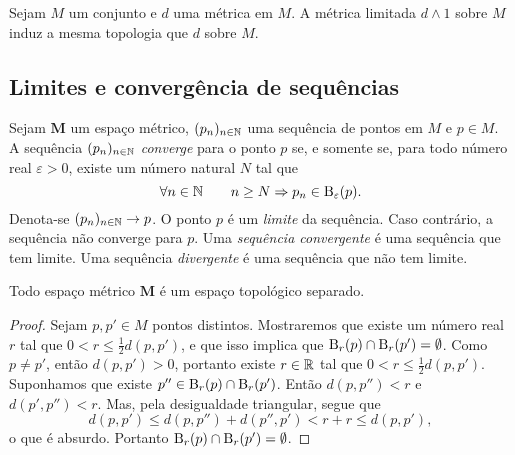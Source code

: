 \begin{exercise}
Sejam $M$ um conjunto e $d$ uma métrica em $M$. A métrica limitada $d \wedge 1$ sobre $M$ induz a mesma topologia que $d$ sobre $M$.
\end{exercise}

\subsection{Limites e convergência de sequências}

\begin{definition}
Sejam $\bm M$ um espaço métrico, $(p_n)_{n \in \mathbb{N}}$ uma sequência de pontos em $M$ e $p \in M$. A sequência $(p_n)_{n \in \mathbb{N}}$  \emph{converge} para o ponto $p$ se, e somente se, para todo número real $\varepsilon > 0$, existe um número natural $N$ tal que
	\begin{equation*}
	\forall n \in \mathbb{N} \qquad n \geq N \Rightarrow p_n \in \mathrm{B}_\varepsilon(p).
	\end{equation*}
Denota-se $(p_n)_{n \in \mathbb{N}} \rightarrow p$. O ponto $p$ é um \emph{limite} da sequência.  Caso contrário, a sequência não converge para $p$. Uma \emph{sequência convergente} é uma sequência que tem limite. Uma sequência \emph{divergente} é uma sequência que não tem limite.
\end{definition}

\begin{proposition}
Todo espaço métrico $\bm M$ é um espaço topológico separado.
\end{proposition}
\begin{proof}
Sejam $p,p' \in M$ pontos distintos. Mostraremos que existe um número real $r$ tal que $0 < r \leq \frac{1}{2} d(p,p')$, e que isso implica que $\mathrm{B}_r(p) \cap \mathrm{B}_r(p') = \emptyset$. Como $p \neq p'$, então $d(p,p') > 0$, portanto existe $r \in \mathbb{R}$ tal que $0 < r \leq \frac{1}{2} d(p,p')$. Suponhamos que existe $p'' \in \mathrm{B}_r(p) \cap \mathrm{B}_r(p')$. Então $d(p,p'')<r$ e $d(p',p'')<r$. Mas, pela desigualdade triangular, segue que
	\begin{equation*}
	d(p,p') \leq d(p,p'') + d(p'',p') < r + r \leq d(p,p'),
	\end{equation*}
o que é absurdo. Portanto $\mathrm{B}_r(p) \cap \mathrm{B}_r(p') = \emptyset$.
\end{proof}

